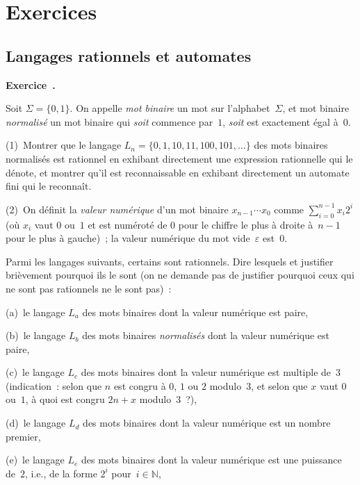 \documentclass[12pt,a4paper]{article}
\theoremstyle{definition}
\newcommand\exercice{%
\refstepcounter{comcnt}\bigskip\noindent\textbf{Exercice~\thecomcnt.}}
\begin{document}
%
%
%

\appendix
\section{Exercices}\label{section-exercises}

\subsection{Langages rationnels et automates}

\exercice

Soit $\Sigma = \{0,1\}$.  On appelle \emph{mot binaire} un mot sur
l'alphabet $\Sigma$, et mot binaire \emph{normalisé} un mot binaire
qui \emph{soit} commence par $1$, \emph{soit} est exactement égal
à $0$.

(1) Montrer que le langage $L_n = \{0, 1, 10, 11, 100, 101,\ldots\}$
des mots binaires normalisés est rationnel en exhibant directement une
expression rationnelle qui le dénote, et montrer qu'il est
reconnaissable en exhibant directement un automate fini qui le
reconnaît.

(2) On définit la \emph{valeur numérique} d'un mot binaire
$x_{n-1}\cdots x_0$ comme $\sum_{i=0}^{n-1} x_i 2^i$ (où $x_i$ vaut
$0$ ou $1$ et est numéroté de $0$ pour le chiffre le plus à droite
à $n-1$ pour le plus à gauche) ; la valeur numérique du mot
vide $\varepsilon$ est $0$.

Parmi les langages suivants, certains sont rationnels.  Dire lesquels
et justifier brièvement pourquoi ils le sont (on ne demande pas de
justifier pourquoi ceux qui ne sont pas rationnels ne le sont pas) :

(a) le langage $L_a$ des mots binaires dont la valeur numérique est
paire,

(b) le langage $L_b$ des mots binaires \emph{normalisés} dont la
valeur numérique est paire,

(c) le langage $L_c$ des mots binaires dont la valeur numérique est
multiple de $3$ (indication : selon que $n$ est congru à $0$, $1$ ou
$2$ modulo $3$, et selon que $x$ vaut $0$ ou $1$, à quoi est congru
$2n+x$ modulo $3$ ?),

(d) le langage $L_d$ des mots binaires dont la valeur numérique est un
nombre premier,

(e) le langage $L_e$ des mots binaires dont la valeur numérique est
une puissance de $2$, i.e., de la forme $2^i$ pour $i\in\mathbb{N}$,
\end{document}
